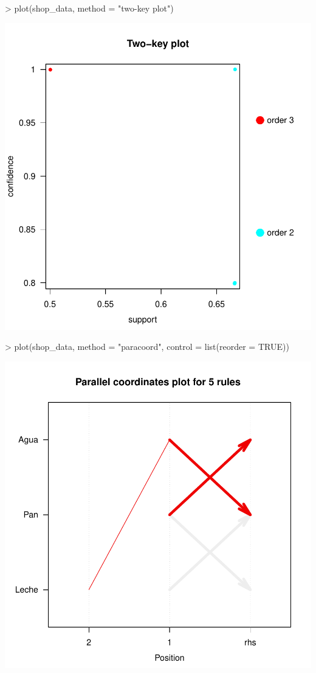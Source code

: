 \documentclass [a4paper] {article}
\begin{document}
\begin{center}
\begin{Schunk}
\begin{Sinput}
> plot(shop_data, method = "two-key plot")
\end{Sinput}
\end{Schunk}
\includegraphics{entrega-grafica_apriori_shop_two_key}
\begin{Schunk}
\begin{Sinput}
> plot(shop_data, method = "paracoord", control = list(reorder = TRUE))
\end{Sinput}
\end{Schunk}
\includegraphics{entrega-grafica_apriori_shop_paracoord}

\end{center}
\end{document}
